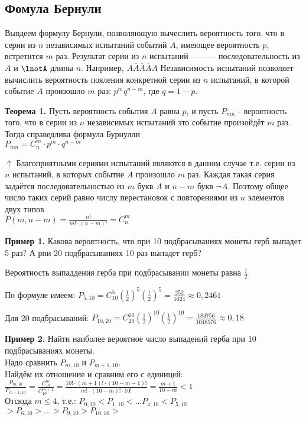 \documentclass{article}
\begin{document}
    \subsection{Фомула Бернули}
    Вывдеем формулу Бернули, позволяющую вычеслить вероятность того, что в серии из $n$ независимых испытаний событий $A$, имеющее вероятность $p$, встретится $m$ раз.
    Результат серии из $n$ испытаний ——— последовательность из $A$ и $\lnotA$ длины $n$.
    Например, \(A\overline{A}\overline{A}\overline{A}A\)
    Независимость испытаний позволяет вычислить вероятность пояления конкретной серии из $n$ испытаний, в которой событие $A$ произошло  $m$ раз: \(p^mq^{n-m}\), где \(q = 1 - p\).
    

    \textbf{Теорема 1.} Пусть вероятность события $A$ равна $p$, и пусть $P_{mn}$ - вероятность того, 
    что в серии из $n$ независимых испытаний это событие произойдёт $m$ раз. Тогда справедлива формула Бурнулли\\
    \(P_{mn} = C_n^m \cdot p^m \cdot q^{n-m}\)
    
    
    \(\uparrow\) Благоприятными сериями испытаний являются в данном случае т.е. серии из $n$ испытаний, в которых событие $A$ произошло $m$ раз.
    Каждая такая серия задаётся последовательностью из $m$ букв $A$ и $n-m$ букв $\lnot A$.
    Поэтому общее число таких серий равно числу перестановок с повторениями из $n$ элементов двух типов \\    
    \(P(m, n-m) = \frac{n!}{m! \cdot (n - m)!} = C_n^m\)
    

    \textbf{Пример 1.} Какова вероятность, что при 10 подбрасываниях монеты герб выпадет 5 раз? А рпи 20 подбрасываниях 10 раз выпадет герб?
    
    Вероятность выпаддения герба при подбрасывании монеты равна \(\frac{1}{2}\)
    
    По формуле имеем: \( P_{5, 10} = C^5_{10}(\frac{1}{2})^5(\frac{1}{2})^5 = \frac{252}{1024} \approx 0,2461\)
    
    Для 20 подбрасываний: \( P_{10, 20} = C^{10}_{20}(\frac{1}{2})^10(\frac{1}{2})^10 = \frac{184756}{1048576} \approx 0,18\)


    \textbf{Пример 2.} Найти наиболее вероятное число выпадений герба при 10 подбрасываниях монеты.\\
    Надо сравнить $P_{m,10}$ и $P_{m+1, 10}$.\\
    Найдём их отношение и сравним его с единицей:\\
    \(\frac{P_{m, 10}}{P_{m + 1, 10}} = \frac{C_{10}^m}{C_{10}^{m + 1}} = \frac{10! \cdot (m + 1)! \cdot (10 - m - 1)!}{m! \cdot (10 - m)! \cdot 10!} = \frac{m + 1}{10 - m} < 1\)\\
    Отсюда \( m \leq 4 \), т.е.: \( P_{0, 10} < P_{1, 10} < ... P_{4, 10} < P_{5, 10}\)  \(> P_{6, 10} > ... > P_{9, 10} >  P_{10, 10} > \)
    
\end{document}
